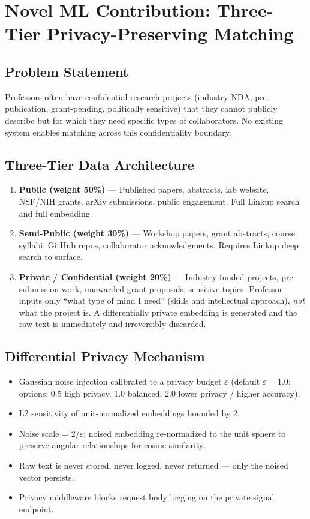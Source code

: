 \documentclass{article}
\begin{document}
\section{Novel ML Contribution: Three-Tier Privacy-Preserving Matching}

\subsection{Problem Statement}
Professors often have confidential research projects (industry NDA, pre-publication,
grant-pending, politically sensitive) that they cannot publicly describe but for which
they need specific types of collaborators. No existing system enables matching across
this confidentiality boundary.

\subsection{Three-Tier Data Architecture}
\begin{enumerate}[label=\textbf{Tier \arabic*:}]
  \item \textbf{Public (weight 50\%)} — Published papers, abstracts, lab website,
        NSF/NIH grants, arXiv submissions, public engagement. Full Linkup search
        and full embedding.
  \item \textbf{Semi-Public (weight 30\%)} — Workshop papers, grant abstracts,
        course syllabi, GitHub repos, collaborator acknowledgments. Requires
        Linkup deep search to surface.
  \item \textbf{Private / Confidential (weight 20\%)} — Industry-funded projects,
        pre-submission work, unawarded grant proposals, sensitive topics. Professor
        inputs only ``what type of mind I need'' (skills and intellectual approach),
        \emph{not} what the project is. A differentially private embedding is
        generated and the raw text is immediately and irreversibly discarded.
\end{enumerate}

\subsection{Differential Privacy Mechanism}
\begin{itemize}
  \item Gaussian noise injection calibrated to a privacy budget $\varepsilon$
        (default $\varepsilon = 1.0$; options: 0.5 high privacy, 1.0 balanced,
        2.0 lower privacy / higher accuracy).
  \item L2 sensitivity of unit-normalized embeddings bounded by 2.
  \item Noise scale = $2 / \varepsilon$; noised embedding re-normalized to the
        unit sphere to preserve angular relationships for cosine similarity.
  \item Raw text is never stored, never logged, never returned — only the noised
        vector persists.
  \item Privacy middleware blocks request body logging on the private signal endpoint.
\end{itemize}
\end{document}
